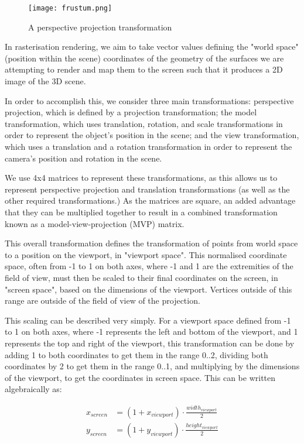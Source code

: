 \begin{figure}
\centering
	\texttt{[image: frustum.png]}
	\caption{A perspective projection transformation}
	\label{fig:perspective-projection}
\end{figure}

In rasterisation rendering, we aim to take vector values defining the "world space" (position within the scene) coordinates of the geometry of the surfaces we are attempting to render and map them to the screen such that it produces a 2D image of the 3D scene.

In order to accomplish this, we consider three main transformations: perspective projection, which is defined by a projection transformation; the model transformation, which uses translation, rotation, and scale transformations in order to represent the object's position in the scene; and the view transformation, which uses a translation and a rotation transformation in order to represent the camera's position and rotation in the scene.

We use 4x4 matrices to represent these transformations, as this allows us to represent perspective projection and translation transformations (as well as the other required transformations.) As the matrices are square, an added advantage that they can be multiplied together to result in a combined transformation known as a model-view-projection (MVP) matrix.

This overall transformation defines the transformation of points from world space to a position on the viewport, in "viewport space". This normalised coordinate space, often from -1 to 1 on both axes, where -1 and 1 are the extremities of the field of view, must then be scaled to their final coordinates on the screen, in "screen space", based on the dimensions of the viewport. Vertices outside of this range are outside of the field of view of the projection.

This scaling can be described very simply. For a viewport space defined from -1 to 1 on both axes, where -1 represents the left and bottom of the viewport, and 1 represents the top and right of the viewport, this transformation can be done by adding 1 to both coordinates to get them in the range 0..2, dividing both coordinates by 2 to get them in the range 0..1, and multiplying by the dimensions of the viewport, to get the coordinates in screen space. This can be written algebraically as:

\begin{align}
	x_{screen} &= (1 + x_{viewport}) \cdot \frac{width_{viewport}}{2}
	\\
	y_{screen} &= (1 + y_{viewport}) \cdot \frac{height_{viewport}}{2}
\end{align}

